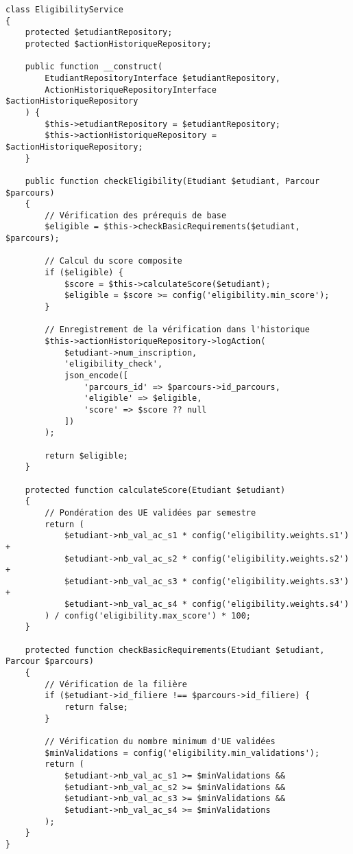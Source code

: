 \documentclass[french,12pt]{report} %
\begin{document}
\begin{lstlisting}[style=phpstyle, caption={Service d'éligibilité - EligibilityService.php}]
class EligibilityService
{
    protected $etudiantRepository;
    protected $actionHistoriqueRepository;
    
    public function __construct(
        EtudiantRepositoryInterface $etudiantRepository,
        ActionHistoriqueRepositoryInterface $actionHistoriqueRepository
    ) {
        $this->etudiantRepository = $etudiantRepository;
        $this->actionHistoriqueRepository = $actionHistoriqueRepository;
    }
    
    public function checkEligibility(Etudiant $etudiant, Parcour $parcours)
    {
        // Vérification des prérequis de base
        $eligible = $this->checkBasicRequirements($etudiant, $parcours);
        
        // Calcul du score composite
        if ($eligible) {
            $score = $this->calculateScore($etudiant);
            $eligible = $score >= config('eligibility.min_score');
        }
        
        // Enregistrement de la vérification dans l'historique
        $this->actionHistoriqueRepository->logAction(
            $etudiant->num_inscription,
            'eligibility_check',
            json_encode([
                'parcours_id' => $parcours->id_parcours,
                'eligible' => $eligible,
                'score' => $score ?? null
            ])
        );
        
        return $eligible;
    }
    
    protected function calculateScore(Etudiant $etudiant)
    {
        // Pondération des UE validées par semestre
        return (
            $etudiant->nb_val_ac_s1 * config('eligibility.weights.s1') +
            $etudiant->nb_val_ac_s2 * config('eligibility.weights.s2') +
            $etudiant->nb_val_ac_s3 * config('eligibility.weights.s3') +
            $etudiant->nb_val_ac_s4 * config('eligibility.weights.s4')
        ) / config('eligibility.max_score') * 100;
    }
    
    protected function checkBasicRequirements(Etudiant $etudiant, Parcour $parcours)
    {
        // Vérification de la filière
        if ($etudiant->id_filiere !== $parcours->id_filiere) {
            return false;
        }
        
        // Vérification du nombre minimum d'UE validées
        $minValidations = config('eligibility.min_validations');
        return (
            $etudiant->nb_val_ac_s1 >= $minValidations &&
            $etudiant->nb_val_ac_s2 >= $minValidations &&
            $etudiant->nb_val_ac_s3 >= $minValidations &&
            $etudiant->nb_val_ac_s4 >= $minValidations
        );
    }
}
\end{lstlisting}
\end{document}
